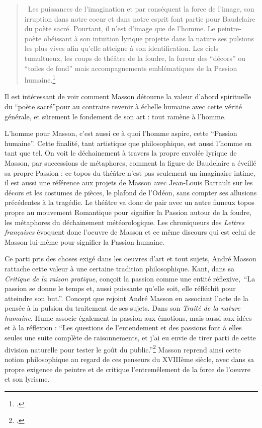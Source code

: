 \begin{quote}
 Les puissances de l’imagination et par conséquent la force de l’image, son irruption dans notre coeur et dans notre esprit font partie pour Baudelaire du poète sacré. Pourtant, il n’est d’image que de l’homme. Le peintre-poète obéissant à son intuition lyrique projette dans la nature ses pulsions les plus vives afin qu’elle atteigne à son identification. Les ciels tumultueux, les coups de théâtre de la foudre, la fureur des \enquote{décors} ou \enquote{toiles de fond} mais accompagnements emblématiques de la Passion humaine.\footcite{baudelairepeintres}\end{quote}
 
 Il est intéressant de voir comment Masson détourne la valeur d’abord spirituelle du \enquote{poète sacré}pour au contraire revenir à échelle humaine avec cette vérité générale, et sûrement le fondement de son art : tout ramène à l’homme. 

	L’homme pour Masson, c’est aussi ce à quoi l’homme aspire, cette \enquote{Passion humaine}. Cette finalité, tant artistique que philosophique, est aussi l’homme en tant que tel. On voit le déchainement à travers la propre envolée lyrique de Masson, par successions de métaphores, comment la figure de Baudelaire a éveillé sa propre Passion : ce topos du théâtre n’est pas seulement un imaginaire intime, il est aussi une référence aux projets de Masson avec Jean-Louis Barrault sur les décors et les costumes de pièces, le plafond de l’Odéon, sans compter ses allusions précédentes à la tragédie. Le théâtre va donc de pair avec un autre fameux topos propre au mouvement Romantique pour signifier la Passion autour de la foudre, les métaphores du déchainement météorologique. Les chroniqueurs des \emph{Lettres françaises} évoquent donc l’oeuvre de Masson et ce même discours qui est celui de Masson lui-même pour signifier la Passion humaine. 

Ce parti pris des choses exigé dans les oeuvres d’art et tout sujets, André Masson rattache cette valeur à une certaine tradition philosophique. Kant, dans sa \emph{Critique de la raison pratique}, conçoit la passion comme une entité réflexive, \enquote{La passion se donne le temps et, aussi puissante qu’elle soit, elle réfléchit pour atteindre son but.}. Concept que rejoint André Masson en associant l’acte de la pensée à la pulsion du traitement de ses sujets. Dans son \emph{Traité de la nature humaine}, Hume associe également la passion aux émotions, mais aussi aux idées et à la réflexion : \enquote{Les questions de l'entendement et des passions font à elles seules une suite complète de raisonnements, et j'ai eu envie de tirer parti de cette division naturelle pour tester le goût du public.}\footcite{hume}  Masson reprend ainsi cette notion philosophique au regard de ces penseurs du XVIIIème siècle, avec dans sa propre exigence de peintre et de critique l’entremêlement de la force de l’oeuvre et son lyrisme. 

